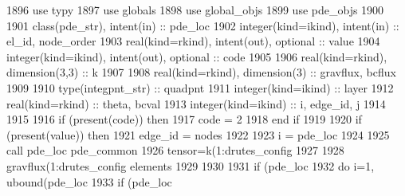 \begin{DoxyCode}
1896       \textcolor{keywordtype}{use }typy
1897       \textcolor{keywordtype}{use }globals
1898       \textcolor{keywordtype}{use }global_objs
1899       \textcolor{keywordtype}{use }pde_objs
1900 
1901       \textcolor{keywordtype}{class}(pde_str), \textcolor{keywordtype}{intent(in)} :: pde\_loc
1902       \textcolor{keywordtype}{integer(kind=ikind)}, \textcolor{keywordtype}{intent(in)}  :: el\_id, node\_order
1903       \textcolor{keywordtype}{real(kind=rkind)}, \textcolor{keywordtype}{intent(out)}, \textcolor{keywordtype}{optional}    :: value
1904       \textcolor{keywordtype}{integer(kind=ikind)}, \textcolor{keywordtype}{intent(out)}, \textcolor{keywordtype}{optional} :: code
1905       
1906       \textcolor{keywordtype}{real(kind=rkind)}, \textcolor{keywordtype}{dimension(3,3)} :: k
1907       
1908       \textcolor{keywordtype}{real(kind=rkind)}, \textcolor{keywordtype}{dimension(3)} :: gravflux, bcflux
1909       
1910       \textcolor{keywordtype}{type}(integpnt_str) :: quadpnt
1911       \textcolor{keywordtype}{integer(kind=ikind)} :: layer
1912       \textcolor{keywordtype}{real(kind=rkind)} :: theta, bcval
1913       \textcolor{keywordtype}{integer(kind=ikind)} :: i, edge\_id, j
1914   
1915   
1916       \textcolor{keywordflow}{if} (\textcolor{keyword}{present}(code)) \textcolor{keywordflow}{then}
1917         code = 2
1918 \textcolor{keywordflow}{      end if}
1919       
1920       \textcolor{keywordflow}{if} (\textcolor{keyword}{present}(\textcolor{keywordtype}{value})) \textcolor{keywordflow}{then}
1921         edge\_id = nodes%
1922 
1923         i = pde\_loc%
1924 
1925         \textcolor{keyword}{call }pde\_loc%
      pde_common%
1926 \textcolor{comment}{                              tensor=k(1:drutes_config%
1927 \textcolor{comment}{}
1928 \textcolor{comment}{        gravflux(1:drutes_config%
      elements%
1929 \textcolor{comment}{        }
1930 \textcolor{comment}{}
1931 \textcolor{comment}{        }\textcolor{keywordflow}{if} (pde\_loc%
1932           \textcolor{keywordflow}{do} i=1, ubound(pde\_loc%
1933             \textcolor{keywordflow}{if} (pde\_loc%
}}
\end{DoxyCode}

